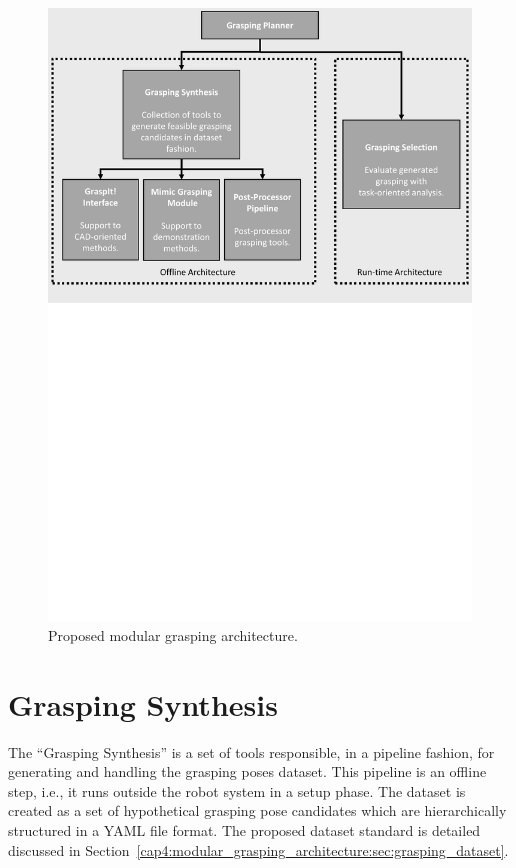 \begin{figure}[h!]
\begin{tcolorbox}
\centerline{\includegraphics[trim={0cm 15cm 0cm 0cm},clip,width=0.95\linewidth,angle=0]{Cap4/Figuras/grasping_framework.pdf}}
\end{tcolorbox}
\caption{Proposed modular grasping architecture.}
\label{fig:grasping_framework_code}
\end{figure}

\section{Grasping Synthesis}
\label{cap4:modular_grasping_architecture:sec:grasping_synthesis}

The ``Grasping Synthesis'' is a set of tools responsible, in a pipeline fashion, for generating and handling the grasping poses dataset. This pipeline is an offline step, i.e., it runs outside the robot system in a setup phase. The dataset is created as a set of hypothetical grasping pose candidates which are hierarchically structured in a YAML file format. The proposed dataset standard is detailed discussed in Section~\ref{cap4:modular_grasping_architecture:sec:grasping_dataset}.

